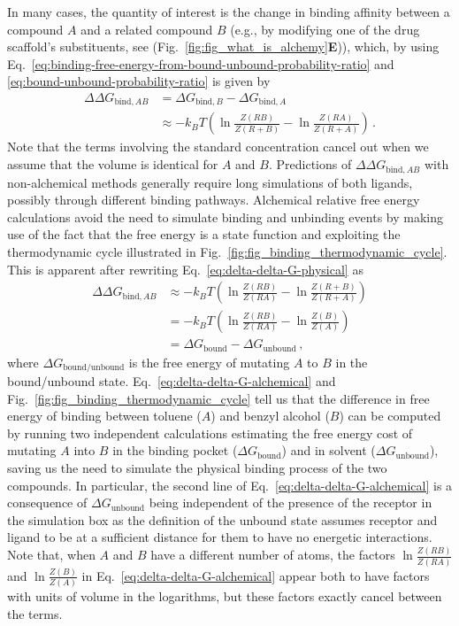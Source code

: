 \documentclass[9pt,bestpractices]{livecoms}
\begin{document}
In many cases, the quantity of interest is the change in binding affinity between a compound $A$ and a related compound $B$ (e.g., by modifying one of the drug scaffold's substituents, see (Fig.~\ref{fig:fig_what_is_alchemy}\textbf{E})), which, by using Eq.~\ref{eq:binding-free-energy-from-bound-unbound-probability-ratio} and \ref{eq:bound-unbound-probability-ratio} is given by
\begin{equation}\label{eq:delta-delta-G-physical}
\begin{split}
    \Delta \Delta G_{\mathrm{bind}, AB} &= \Delta G_{\mathrm{bind}, B} - \Delta G_{\mathrm{bind}, A} \\
    &\approx -k_BT \left( \ln \frac{Z(RB)}{Z(R+B)} - \ln \frac{Z(RA)}{Z(R+A)} \right) \, .
\end{split}
\end{equation}
Note that the terms involving the standard concentration cancel out when we assume that the volume is identical for $A$ and $B$.
Predictions of $\Delta \Delta G_{\mathrm{bind}, AB}$ with non-alchemical methods generally require long simulations of both ligands, possibly through different binding pathways.
Alchemical relative free energy calculations avoid the need to simulate binding and unbinding events by making use of the fact that the free energy is a state function and exploiting the thermodynamic cycle illustrated in Fig.~\ref{fig:fig_binding_thermodynamic_cycle}.
This is apparent after rewriting Eq.~\ref{eq:delta-delta-G-physical} as
\begin{equation}\label{eq:delta-delta-G-alchemical}
\begin{split}
    \Delta \Delta G_{\mathrm{bind}, AB} &\approx -k_BT \left( \ln \frac{Z(RB)}{Z(RA)} - \ln \frac{Z(R+B)}{Z(R+A)} \right) \\
    &= -k_BT \left( \ln \frac{Z(RB)}{Z(RA)} - \ln \frac{Z(B)}{Z(A)} \right) \\
    &= \Delta G_{\mathrm{bound}} - \Delta G_{\mathrm{unbound}} \, ,
\end{split}
\end{equation}
where $\Delta G_{\mathrm{bound/unbound}}$ is the free energy of mutating $A$ to $B$ in the bound/unbound state.
Eq.~\ref{eq:delta-delta-G-alchemical} and Fig.~\ref{fig:fig_binding_thermodynamic_cycle} tell us that the difference in free energy of binding between toluene ($A$) and benzyl alcohol ($B$) can be computed by running two independent calculations estimating the free energy cost of mutating $A$ into $B$ in the binding pocket ($\Delta G_{\mathrm{bound}}$) and in solvent ($\Delta G_{\mathrm{unbound}}$), saving us the need to simulate the physical binding process of the two compounds.
In particular, the second line of Eq.~\ref{eq:delta-delta-G-alchemical} is a consequence of $\Delta G_{\mathrm{unbound}}$ being independent of the presence of the receptor in the simulation box as the definition of the unbound state assumes receptor and ligand to be at a sufficient distance for them to have no energetic interactions.
Note that, when $A$ and $B$ have a different number of atoms, the factors $ \ln \frac{Z(RB)}{Z(RA)}$ and $\ln \frac{Z(B)}{Z(A)}$ in   Eq.~\ref{eq:delta-delta-G-alchemical} appear both to have factors with units of volume in the logarithms, but these factors exactly cancel between the terms.
\end{document}
